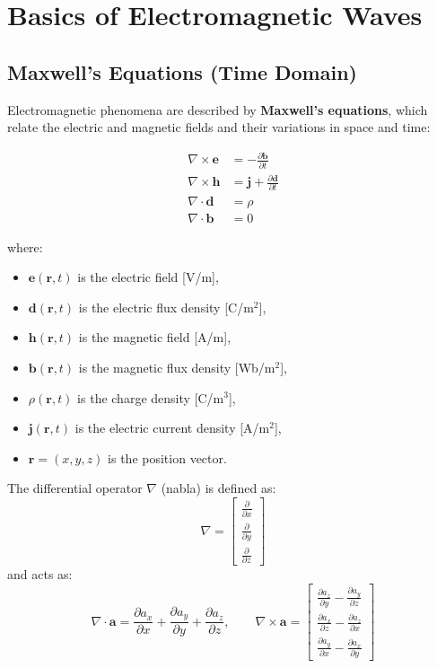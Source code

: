
\chapter{Basics of Electromagnetic Waves}

\section*{Maxwell’s Equations (Time Domain)}

Electromagnetic phenomena are described by \textbf{Maxwell’s equations}, which relate the electric and magnetic fields and their variations in space and time:

\begin{align}
\nabla \times \mathbf{e} &= - \frac{\partial \mathbf{b}}{\partial t} \\
\nabla \times \mathbf{h} &= \mathbf{j} + \frac{\partial \mathbf{d}}{\partial t} \\
\nabla \cdot \mathbf{d} &= \rho \\
\nabla \cdot \mathbf{b} &= 0
\end{align}

where:
\begin{itemize}
    \item $\mathbf{e}(\mathbf{r},t)$ is the electric field [V/m],
    \item $\mathbf{d}(\mathbf{r},t)$ is the electric flux density [C/m$^2$],
    \item $\mathbf{h}(\mathbf{r},t)$ is the magnetic field [A/m],
    \item $\mathbf{b}(\mathbf{r},t)$ is the magnetic flux density [Wb/m$^2$],
    \item $\rho(\mathbf{r},t)$ is the charge density [C/m$^3$],
    \item $\mathbf{j}(\mathbf{r},t)$ is the electric current density [A/m$^2$],
    \item $\mathbf{r} = (x, y, z)$ is the position vector.
\end{itemize}

The differential operator $\nabla$ (nabla) is defined as:
\[
\nabla = 
\begin{bmatrix}
\frac{\partial}{\partial x} \\
\frac{\partial}{\partial y} \\
\frac{\partial}{\partial z}
\end{bmatrix}
\]
and acts as:
\[
\nabla \cdot \mathbf{a} = 
\frac{\partial a_x}{\partial x} +
\frac{\partial a_y}{\partial y} +
\frac{\partial a_z}{\partial z},
\qquad
\nabla \times \mathbf{a} = 
\begin{bmatrix}
\frac{\partial a_z}{\partial y} - \frac{\partial a_y}{\partial z} \\
\frac{\partial a_x}{\partial z} - \frac{\partial a_z}{\partial x} \\
\frac{\partial a_y}{\partial x} - \frac{\partial a_x}{\partial y}
\end{bmatrix}
\]

